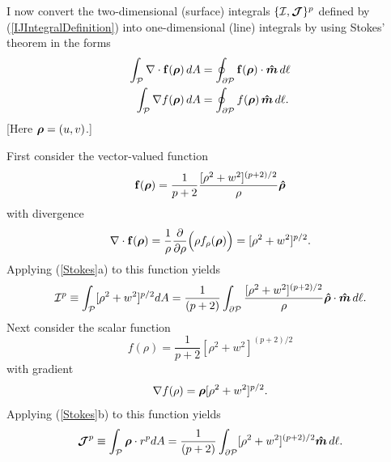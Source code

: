 \documentclass[letterpaper]{article}
\begin{document}
I now convert the two-dimensional (surface) integrals 
$\{\mathcal{I}, \boldsymbol{\mathcal{J}}\}^p$ defined by (\ref{IJIntegralDefinition})
into one-dimensional (line) integrals by using Stokes' theorem in the forms
\begin{subequations}
\begin{align}
 \int_{\mathcal{P}} \nabla \cdot \mathbf{f}(\boldsymbol{\rho})\,dA
 &=
 \oint_{\partial \mathcal{P}} \mathbf{f}(\boldsymbol{\rho}) \cdot \boldsymbol{\hat{m}} \, d\ell
\\
 \int_{\mathcal{P}} \nabla f(\boldsymbol{\rho})\,dA
 &=
 \oint_{\partial \mathcal{P}} f(\boldsymbol{\rho}) \, \boldsymbol{\hat{m}} \, d\ell.
\end{align}
\label{Stokes}
\end{subequations}
[Here $\boldsymbol{\rho}=(u,v)$.]

First consider the vector-valued function
$$ \mathbf{f}(\boldsymbol{\rho})=
   \frac{1}{p+2}
   \frac{ [\rho^2 + w^2]^{(p+2)/2}}{\rho}\boldsymbol{\hat \rho} $$
with divergence
$$
   \nabla \cdot \mathbf{f}(\boldsymbol{\rho})=
   \frac{1}{\rho}\frac{\partial }{\partial \rho}\Big(\rho f_\rho(\boldsymbol{\rho}) \Big)
   = [\rho^2 + w^2]^{p/2}.
$$
Applying (\ref{Stokes}a) to this function yields
$$\mathcal{I}^p
  \equiv \int_{\mathcal{P}} [\rho^2 + w^2]^{p/2} dA
  =\frac{1}{(p+2)}\int_{\partial \mathcal{P}} 
   \frac{ [\rho^2 + w^2]^{(p+2)/2} } { \rho } 
   \boldsymbol{\hat \rho}\cdot\boldsymbol{\hat{m}} \, d\ell.
$$
Next consider the scalar function 
$$ f(\rho) = \frac{1}{p+2} [\rho^2 + w^2]^{ (p+2)/2} $$
with gradient
$$ \nabla f(\rho) = \boldsymbol{\rho} [\rho^2 + w^2]^{p/2}.$$
Applying (\ref{Stokes}b) to this function yields
$$\boldsymbol{\mathcal{J}}^p
  \equiv  \int_{\mathcal{P}} \boldsymbol{\rho} \cdot r^p dA
  =\frac{1}{(p+2)}\int_{\partial \mathcal{P}}
   [\rho^2 + w^2]^{(p+2)/2}  \boldsymbol{\hat{m}} \, d\ell.
$$

\end{document}
